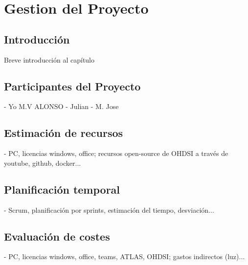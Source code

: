 \chapter{Gestion del Proyecto}\label{cap:gestión}

\section{Introducción}
Breve introducción al capítulo

\section{Participantes del Proyecto}

- Yo M.V ALONSO
- Julian
- M. Jose 



\section{Estimación de recursos}

- PC, licencias windows, office; recursos open-source de OHDSI a través de youtube, github, docker...

\section{Planificación temporal}

- Scrum, planificación por sprints, estimación del tiempo, desviación...

\section{Evaluación de costes}

- PC, licencias windows, office, teams, ATLAS, OHDSI; gastos indirectos (luz)...

